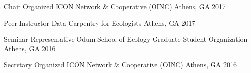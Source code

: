 

\begin{cvhonors}
\cvhonor
    {Chair} %
    {Organized ICON Network \& Cooperative (OINC)} %
    {Athens, GA} %
    {2017} %

\cvhonor
    {Peer Instructor} %
    {Data Carpentry for Ecologists} %
    {Athens, GA} %
    {2017} %

\cvhonor
    {Seminar Representative} %
    {Odum School of Ecology Graduate Student Organization} %
    {Athens, GA} %
    {2016} %

\cvhonor
    {Secretary} %
    {Organized ICON Network \& Cooperative (OINC)} %
    {Athens, GA} %
    {2016} %

\end{cvhonors}
